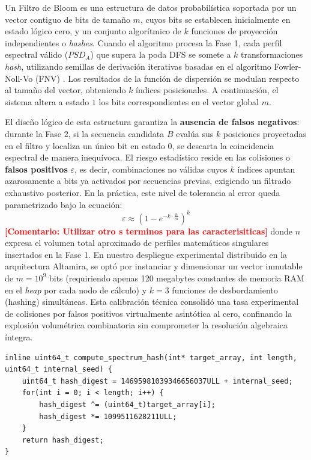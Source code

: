 \documentclass[12pt,a4paper]{tfg_domingo}
\newcommand{\Comentario}[1]{\textcolor{red}{\textbf{[Comentario:
      #1]}}}
\begin{document}
Un Filtro de Bloom es una estructura de datos probabilística soportada por un vector contiguo de bits de tamaño $m$, cuyos bits se establecen inicialmente en estado lógico cero, y un conjunto algorítmico de $k$ funciones de proyección independientes o \textit{hashes}. Cuando el algoritmo procesa la Fase 1, cada perfil espectral válido ($PSD_A$) que supera la poda DFS se somete a $k$ transformaciones \textit{hash}, utilizando semillas de derivación iterativas basadas en el algoritmo Fowler-Noll-Vo (FNV) \cite{fowler1991fnv}. Los resultados de la función de dispersión se modulan respecto al tamaño del vector, obteniendo $k$ índices posicionales. A continuación, el sistema altera a estado $1$ los bits correspondientes en el vector global $m$. 

El diseño lógico de esta estructura garantiza la \textbf{ausencia de falsos negativos}: durante la Fase 2, si la secuencia candidata $B$ evalúa sus $k$ posiciones proyectadas en el filtro y localiza un único bit en estado $0$, se descarta la coincidencia espectral de manera inequívoca. El riesgo estadístico reside en las colisiones o \textbf{falsos positivos} $\varepsilon$, es decir, combinaciones no válidas cuyos $k$ índices apuntan azarosamente a bits ya activados por secuencias previas, exigiendo un filtrado exhaustivo posterior. En la práctica, este nivel de tolerancia al error queda parametrizado bajo la ecuación:
$$ \varepsilon \approx \left( 1 - e^{-k \cdot \frac{n}{m}} \right)^k $$
\Comentario{Utilizar otro s terminos para las caracterisiticas}
donde $n$ expresa el volumen total aproximado de perfiles matemáticos
singulares insertados en la Fase 1. En nuestro despliegue experimental
distribuido en la arquitectura Altamira, se optó por  instanciar y
dimensionar un vector inmutable de $m = 10^9$ bits (requiriendo apenas
120 megabytes constantes de memoria RAM en el \emph{heap} por  cada
nodo de cálculo) y $k = 3$ funciones de desbordamiento (hashing)
simultáneas. Esta calibración técnica consolidó una tasa  experimental
de colisiones por falsos positivos virtualmente asintótica al cero,
confinando la explosión volumétrica combinatoria sin  comprometer la resolución algebraica íntegra.

\begin{lstlisting}[caption={Generador de proyecciones Hash paramétricas (FNV-1a) para su uso vectorizado en Filtros de Bloom concurrentes}, label={lst:bloom_hash}]
inline uint64_t compute_spectrum_hash(int* target_array, int length, uint64_t internal_seed) {
    uint64_t hash_digest = 14695981039346656037ULL + internal_seed;
    for(int i = 0; i < length; i++) {
        hash_digest ^= (uint64_t)target_array[i];
        hash_digest *= 1099511628211ULL;
    }
    return hash_digest;
}
\end{lstlisting}
\end{document}
